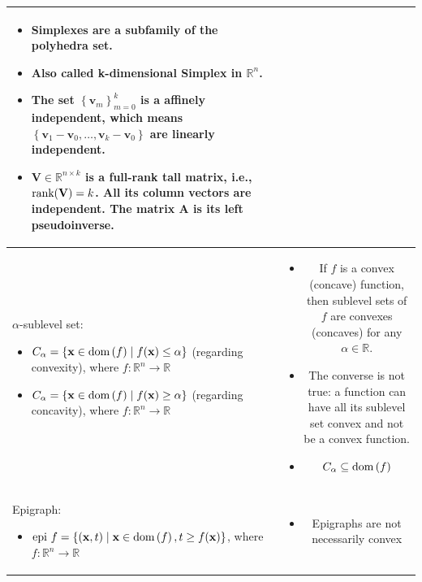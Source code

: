 \documentclass{article}
\newcommand{\dom}[1]{\ensuremath{\textnormal{dom}\left(#1\right)}} %
\begin{document}
\begin{xltabular}{\textwidth}{|A|C|}
	\begin{itemize}[leftmargin=*]
		\item Simplexes are a subfamily of the polyhedra set.
		\item Also called k-dimensional Simplex in \(\mathbb{R}^{n}\).
		\item The set \(\left\{ \mathbf{v}_m \right\}_{m=0}^{k}\) is a affinely independent, which means \(\left\{ \mathbf{v}_1-\mathbf{v}_0, \dots, \mathbf{v}_k-\mathbf{v}_0 \right\}\) are linearly independent.
		\item \(\mathbf{V} \in \mathbb{R}^{n\times k}\) is a full-rank tall matrix, i.e., \(\textnormal{rank}(\mathbf{V}) = k\). All its column vectors are independent. The matrix \(\mathbf{A}\) is its left pseudoinverse.
	\end{itemize}\\
	\hline
	\(\alpha\)-sublevel set:
	\begin{itemize}[leftmargin=*]
		\item \(C_\alpha = \{\mathbf{x} \in \dom{f} \mid f(\mathbf{x}) \leq \alpha\}\) (regarding convexity), where \(f: \mathbb{R}^{n} \rightarrow \mathbb{R}\)
		\item \(C_\alpha = \{\mathbf{x} \in \dom{f} \mid f(\mathbf{x}) \geq \alpha\}\) (regarding concavity), where \(f: \mathbb{R}^{n} \rightarrow \mathbb{R}\)
	\end{itemize} & \vspace{-3.5ex}
	\begin{itemize}[leftmargin=*]
		\item If \(f\) is a convex (concave) function, then sublevel sets of \(f\) are convexes (concaves) for any \(\alpha\in \mathbb{R}\).
		\item The converse is not true: a function can have all its sublevel set convex and not be a convex function.
		\item \(C_\alpha \subseteq \dom{f}\)
	\end{itemize}\\
	\hline
	Epigraph:
	\begin{itemize}[leftmargin=*]
		\item \(\textnormal{epi } f = \{(\mathbf{x}, t)\mid \mathbf{x} \in \dom{f}, t\geq f(\mathbf{x})\}\), where \(f: \mathbb{R}^{n} \rightarrow \mathbb{R}\)
	\end{itemize} & \vspace{-3.5ex}
	\begin{itemize}[leftmargin=*]
		\item Epigraphs are not necessarily convex

\end{itemize}
\end{xltabular}
\end{document}
